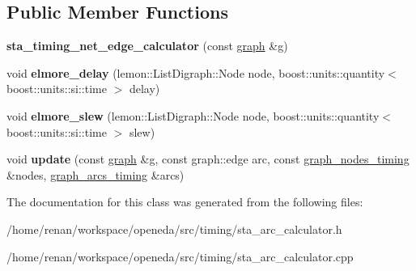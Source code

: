 \subsection*{Public Member Functions}
\begin{DoxyCompactItemize}
\item 
\hypertarget{classophidian_1_1timing_1_1sta__timing__net__edge__calculator_a3ffa2d1f1277e2710244d369b6a1b43b}{{\bfseries sta\-\_\-timing\-\_\-net\-\_\-edge\-\_\-calculator} (const \hyperlink{classophidian_1_1timing_1_1graph}{graph} \&g)}\label{classophidian_1_1timing_1_1sta__timing__net__edge__calculator_a3ffa2d1f1277e2710244d369b6a1b43b}

\item 
\hypertarget{classophidian_1_1timing_1_1sta__timing__net__edge__calculator_ae32b4f4ac34c93696461cfa9b522d637}{void {\bfseries elmore\-\_\-delay} (lemon\-::\-List\-Digraph\-::\-Node node, boost\-::units\-::quantity$<$ boost\-::units\-::si\-::time $>$ delay)}\label{classophidian_1_1timing_1_1sta__timing__net__edge__calculator_ae32b4f4ac34c93696461cfa9b522d637}

\item 
\hypertarget{classophidian_1_1timing_1_1sta__timing__net__edge__calculator_af4a5d464ed082b9eaf1a2b66f6773e19}{void {\bfseries elmore\-\_\-slew} (lemon\-::\-List\-Digraph\-::\-Node node, boost\-::units\-::quantity$<$ boost\-::units\-::si\-::time $>$ slew)}\label{classophidian_1_1timing_1_1sta__timing__net__edge__calculator_af4a5d464ed082b9eaf1a2b66f6773e19}

\item 
\hypertarget{classophidian_1_1timing_1_1sta__timing__net__edge__calculator_ae86054b615d75b84346404dc87489b82}{void {\bfseries update} (const \hyperlink{classophidian_1_1timing_1_1graph}{graph} \&g, const graph\-::edge arc, const \hyperlink{classophidian_1_1timing_1_1graph__nodes__timing}{graph\-\_\-nodes\-\_\-timing} \&nodes, \hyperlink{classophidian_1_1timing_1_1graph__arcs__timing}{graph\-\_\-arcs\-\_\-timing} \&arcs)}\label{classophidian_1_1timing_1_1sta__timing__net__edge__calculator_ae86054b615d75b84346404dc87489b82}

\end{DoxyCompactItemize}


The documentation for this class was generated from the following files\-:\begin{DoxyCompactItemize}
\item 
/home/renan/workspace/openeda/src/timing/sta\-\_\-arc\-\_\-calculator.\-h\item 
/home/renan/workspace/openeda/src/timing/sta\-\_\-arc\-\_\-calculator.\-cpp\end{DoxyCompactItemize}
